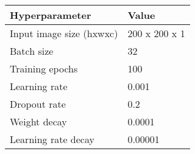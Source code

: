 \begin{table}[H]
	\begin{tabular}{|l|l|}
		\hline
		\textbf{Hyperparameter} & \textbf{Value}                                                                                                                                                                                                                            \\ \hline
		Input image size (hxwxc)                 & 200 x 200 x 1                                                                                                                                                                                                                                              \\ \hline
		Batch size                               & 32                                                                                                                                                                                                                                                         \\ \hline
		Training epochs                          & 100                                                                                                                                                                                                                                                        \\ \hline
		Learning rate                            & 0.001                                                                                                                                                                                                                                                      \\ \hline
		Dropout rate                             & 0.2                                                                                                                                                                                                                                                        \\ \hline
		Weight decay                             & 0.0001                                                                                                                                                                                                                                                     \\ \hline
		Learning rate decay                      & 0.00001                                                                                                                                                                                                                                                    \\ \hline

\end{tabular}
\end{table}
